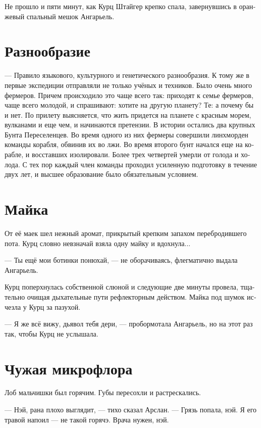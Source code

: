 \documentclass[a4paper,12pt,fleqn]{book}\usepackage{polyglossia}\setdefaultlanguage[babelshorthands=true]{russian}\setotherlanguage{english}\defaultfontfeatures{Ligatures=TeX,Mapping=tex-text}\usepackage{xcolor}\newcommand{\ml}[3]{#2}
\begin{document}
Не прошло и пяти минут, как Курц Штайгер крепко спала, завернувшись в оранжевый спальный мешок Ангарьель.

\section{Разнообразие}

--- Правило языкового, культурного и генетического разнообразия.
К тому же в первые экспедиции отправляли не только учёных и техников.
Было очень много фермеров.
Причем происходило это чаще всего так: приходят к семье фермеров, чаще всего молодой, и спрашивают: хотите на другую планету?
Те: а почему бы и нет.
По прилету выясняется, что жить придется на планете с красным морем, вулканами и еще чем,  и начинаются претензии.
В истории остались два крупных Бунта Переселенцев.
Во время одного из них фермеры совершили линхморден команды корабля, обвинив их во лжи.
Во время второго бунт начался еще на корабле, и восставших изолировали.
Более трех четвертей умерли от голода и холода.
С тех пор каждый член команды проходил усиленную подготовку в течение двух лет, и высшее образование было обязательным условием.

\section{Майка}

От её маек шел нежный аромат, прикрытый крепким запахом перебродившего пота.
Курц словно невзначай взяла одну майку и вдохнула...

--- Ты ещё мои ботинки понюхай, --- не оборачиваясь, флегматично выдала Ангарьель.

Курц поперхнулась собственной слюной и следующие две минуты провела, тщательно очищая дыхательные пути рефлекторным действом.
Майка под шумок исчезла у Курц за пазухой.

--- Я же всё вижу, дьявол тебя дери, --- пробормотала Ангарьель, но на этот раз так, чтобы Курц не услышала.

\section{Чужая микрофлора}

Лоб мальчишки был горячим.
Губы пересохли и растрескались.

--- Нэй, рана плохо выглядит, --- тихо сказал Арслан.
--- Грязь попала, нэй.
Я его травой напоил --- не такой горячэ.
Врача нужен, нэй.
\end{document}
